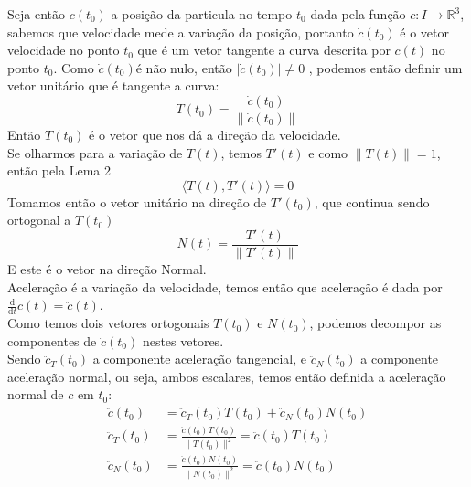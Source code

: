 \documentclass[12pt,letterpaper]{article}
\begin{document}
Seja então \(c(t_0)\) a posição da particula no tempo \(t_0\) dada pela função \(c: I \to \mathbb{R}^3\), sabemos que velocidade mede a variação da posição, portanto \(\dot{c}(t_0)\) é o vetor velocidade no ponto \(t_0\) que é um vetor tangente a curva descrita por \(c(t)\) no ponto \(t_0\). Como \(\dot{c}(t_0)\)é não nulo, então \(\lvert \dot{c}(t_0) \rvert \neq 0\) , podemos então definir um vetor unitário que é tangente a curva:
\[
T(t_0) = \frac{\dot{c}(t_0)}{\lVert \dot{c}(t_0) \rVert}
\]
Então \(T(t_0)\) é o vetor que nos dá a direção da velocidade.\\
Se olharmos para a variação de \(T(t)\), temos \(T'(t)\) e como \(\lVert T(t) \rVert = 1\), então pela Lema 2 \[\langle T(t), T'(t) \rangle = 0\]
Tomamos então o vetor unitário na direção de \(T'(t_0)\), que continua sendo ortogonal a \(T(t_0)\)\\
\[N(t) = \frac{T'(t)}{\lVert T'(t) \rVert}\]
E este é o vetor na direção Normal.\\
Aceleração é a variação da velocidade, temos então que aceleração é dada por \(\frac{\mathrm{d}}{\mathrm{d}t}\dot{c}(t) = \ddot{c}(t)\).\\
Como temos dois vetores ortogonais \(T(t_0)\) e \(N(t_0)\), podemos decompor as componentes de \(\ddot{c}(t_0)\) nestes vetores.\\
Sendo \(\ddot{c}_T(t_0)\) a componente aceleração tangencial, e \(\ddot{c}_N(t_0)\) a componente aceleração normal, ou seja, ambos escalares, temos então definida a aceleração normal de \(c\) em \(t_0\):
\begin{align*}
  \ddot{c}(t_0) &= \ddot{c}_T(t_0) T(t_0) + \ddot{c}_N(t_0) N(t_0)\\
  \ddot{c}_T(t_0) &= \frac{\ddot{c}(t_0) T(t_0)}{\lVert T(t_0) \rVert ^2}  = \ddot{c}(t_0) T(t_0)\\
  \ddot{c}_N(t_0) &= \frac{\ddot{c}(t_0) N(t_0)}{\lVert N(t_0) \rVert ^2}  = \ddot{c}(t_0) N(t_0)\\
\end{align*}
\end{document}

